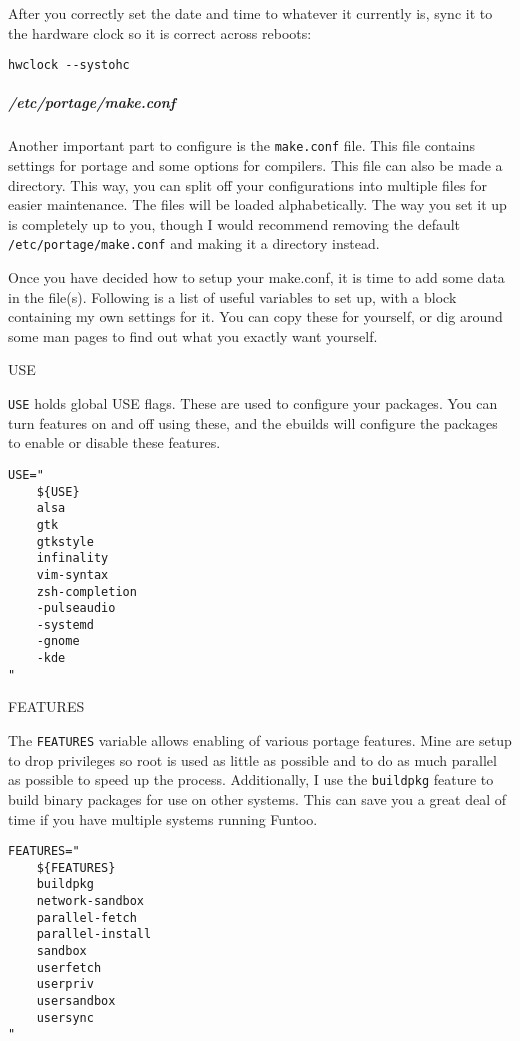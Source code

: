After you correctly set the date and time to whatever it currently is,
sync it to the hardware clock so it is correct across reboots:

\begin{verbatim}
hwclock --systohc
\end{verbatim}

\subparagraph{/etc/portage/make.conf}\label{etcportagemake.conf}

Another important part to configure is the \texttt{make.conf} file. This
file contains settings for portage and some options for compilers. This
file can also be made a directory. This way, you can split off your
configurations into multiple files for easier maintenance. The files
will be loaded alphabetically. The way you set it up is completely up to
you, though I would recommend removing the default
\texttt{/etc/portage/make.conf} and making it a directory instead.

Once you have decided how to setup your make.conf, it is time to add
some data in the file(s). Following is a list of useful variables to set
up, with a block containing my own settings for it. You can copy these
for yourself, or dig around some man pages to find out what you exactly
want yourself.

USE

\texttt{USE} holds global USE flags. These are used to configure your
packages. You can turn features on and off using these, and the ebuilds
will configure the packages to enable or disable these features.

\begin{verbatim}
USE="
    ${USE}
    alsa
    gtk
    gtkstyle
    infinality
    vim-syntax
    zsh-completion
    -pulseaudio
    -systemd
    -gnome
    -kde
"
\end{verbatim}

FEATURES

The \texttt{FEATURES} variable allows enabling of various portage
features. Mine are setup to drop privileges so root is used as little as
possible and to do as much parallel as possible to speed up the process.
Additionally, I use the \texttt{buildpkg} feature to build binary
packages for use on other systems. This can save you a great deal of
time if you have multiple systems running Funtoo.

\begin{verbatim}
FEATURES="
    ${FEATURES}
    buildpkg
    network-sandbox
    parallel-fetch
    parallel-install
    sandbox
    userfetch
    userpriv
    usersandbox
    usersync
"
\end{verbatim}

